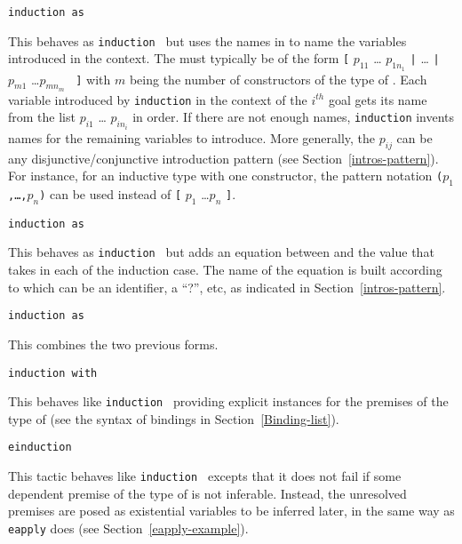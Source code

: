 \begin{Variants}
\item{\tt induction {\term} as {\disjconjintropattern}}
  
  This behaves as {\tt induction {\term}} but uses the names in
  {\disjconjintropattern} to name the variables introduced in the context.
  The {\disjconjintropattern} must typically be of the form
  {\tt [} $p_{11}$ \ldots
  $p_{1n_1}$ {\tt |} {\ldots} {\tt |} $p_{m1}$ \ldots $p_{mn_m}$ {\tt
    ]} with $m$ being the number of constructors of the type of
  {\term}. Each variable introduced by {\tt induction} in the context
  of the $i^{th}$ goal gets its name from the list $p_{i1}$ \ldots
  $p_{in_i}$ in order. If there are not enough names, {\tt induction}
  invents names for the remaining variables to introduce. More
  generally, the $p_{ij}$ can be any disjunctive/conjunctive
  introduction pattern (see Section~\ref{intros-pattern}). For instance,
  for an inductive type with one constructor, the pattern notation
  {\tt ($p_{1}$,\ldots,$p_{n}$)} can be used instead of
  {\tt [} $p_{1}$ \ldots $p_{n}$ {\tt ]}.

\item{\tt induction {\term} as {\namingintropattern}}

  This behaves as {\tt induction {\term}} but adds an equation between
  {\term} and the value that {\term} takes in each of the induction
  case.  The name of the equation is built according to
  {\namingintropattern} which can be an identifier, a ``?'', etc, as
  indicated in Section~\ref{intros-pattern}.

\item{\tt induction {\term} as {\namingintropattern} {\disjconjintropattern}}

  This combines the two previous forms.

\item{\tt induction {\term} with \bindinglist}

  This behaves like \texttt{induction {\term}} providing explicit
  instances for the premises of the type of {\term} (see the syntax of
  bindings in Section~\ref{Binding-list}).

\item{\tt einduction {\term}}

  This tactic behaves like \texttt{induction {\term}} excepts that it
  does not fail if some dependent premise of the type of {\term} is
  not inferable. Instead, the unresolved premises are posed as
  existential variables to be inferred later, in the same way as {\tt
  eapply} does (see Section~\ref{eapply-example}).


\end{Variants}
